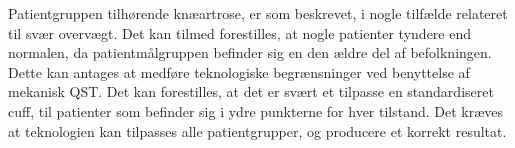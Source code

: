 Patientgruppen tilhørende knæartrose, er som beskrevet, i nogle tilfælde relateret til svær overvægt. Det kan tilmed forestilles, at nogle patienter tyndere end normalen, da patientmålgruppen befinder sig en den ældre del af befolkningen. Dette kan antages at medføre teknologiske begrænsninger ved benyttelse af mekanisk QST. Det kan forestilles, at det er svært et tilpasse en standardiseret cuff, til patienter som befinder sig i ydre punkterne for hver tilstand. Det kræves at teknologien kan tilpasses alle patientgrupper, og producere et korrekt resultat. 